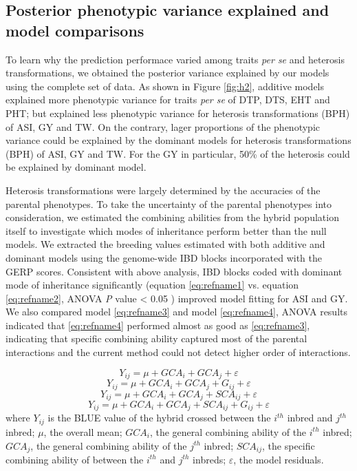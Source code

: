 \documentclass[9pt,twocolumn,twoside]{gsajnl}
\begin{document}
\subsection*{Posterior phenotypic variance explained and model comparisons}

To learn why the prediction performace varied among traits \emph{per se} and heterosis transformations, we obtained the posterior variance explained by our models using the complete set of data. As shown in Figure \ref{fig:h2}, additive models explained more phenotypic variance for traits \emph{per se} of DTP, DTS, EHT and PHT; but explained less phenotypic variance for heterosis transformations (BPH) of ASI, GY and TW. On the contrary, lager proportions of the phenotypic variance could be explained by the dominant models for heterosis transformations (BPH) of ASI, GY and TW. For the GY in particular, 50\% of the heterosis could be explained by dominant model.   

Heterosis transformations were largely determined by the accuracies of the parental phenotypes. To take the uncertainty of the parental phenotypes into consideration, we estimated the combining abilities from the hybrid population itself to investigate which modes of inheritance perform better than the null models. We extracted the breeding values estimated with both additive and dominant models using the genome-wide IBD blocks incorporated with the GERP scores. Consistent with above analysis, IBD blocks coded with dominant mode of inheritance significantly (equation \ref{eq:refname1} vs. equation \ref{eq:refname2}, ANOVA \emph{P} value < 0.05 ) improved model fitting for ASI and GY. We also compared model \ref{eq:refname3} and model \ref{eq:refname4}, ANOVA results indicated that \ref{eq:refname4} performed almost as good as \ref{eq:refname3}, indicating that specific combining ability captured most of the parental interactions and the current method could not detect higher order of interactions. 

\begin{equation}
Y_{ij} = \mu + GCA_{i} + GCA_{j} + \varepsilon
\label{eq:refname1}
\end{equation}
\begin{equation}
Y_{ij} = \mu + GCA_{i} + GCA_{j} +  G_{ij} + \varepsilon
\label{eq:refname2}
\end{equation}
\begin{equation}
Y_{ij} = \mu + GCA_{i} + GCA_{j} + SCA_{ij} + \varepsilon
\label{eq:refname3}
\end{equation}
\begin{equation}
Y_{ij} = \mu + GCA_{i} + GCA_{j} + SCA_{ij} + G_{ij} + \varepsilon
\label{eq:refname4}
\end{equation}
where 
$Y_{ij}$ is the BLUE value of the hybrid crossed between the $i^{th}$ inbred and $j^{th}$ inbred; 
$\mu$, the overall mean; 
$GCA_{i}$, the general combining ability of the $i^{th}$ inbred;
$GCA_{j}$, the general combining ability of the $j^{th}$ inbred;
$SCA_{ij}$, the specific combining ability of between the $i^{th}$ and $j^{th}$ inbreds;
$\varepsilon$, the model residuals.
\end{document}
